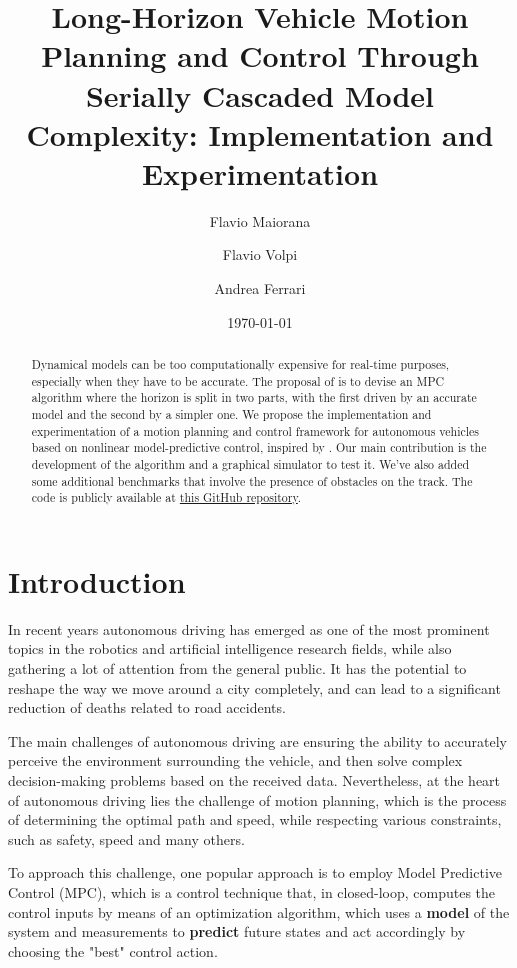 \documentclass[a4paper, onecolumn, 12pt]{article}
\title{Long-Horizon Vehicle Motion Planning and Control Through Serially Cascaded Model Complexity: Implementation and Experimentation}
\author{Flavio Maiorana \and Flavio Volpi \and Andrea Ferrari}
\date{\today}
\begin{document}
\maketitle
\begin{abstract}
    Dynamical models can be too computationally expensive for real-time
    purposes, especially when they have to be accurate. The proposal of
    \cite{paper} is to devise an MPC algorithm where the horizon is split in two
    parts, with the first driven by an accurate model and the second by a
    simpler one. We propose the implementation and experimentation of a motion
    planning and control framework for autonomous vehicles based on nonlinear
    model-predictive control, inspired by \cite{paper}. Our main contribution is
    the development of the algorithm and a graphical simulator to test it. We've
    also added some additional benchmarks that involve the presence of obstacles
    on the track. The code is publicly available at
    \href{https://github.com/neverorfrog/vehicle-control}{this GitHub
    repository}.
\end{abstract}

\newpage
\tableofcontents

\newpage
\section{Introduction}

In recent years autonomous driving has emerged as one of the most prominent
topics in the robotics and artificial intelligence research fields, while also
gathering a lot of attention from the general public. It has the potential to
reshape the way we move around a city completely, and can lead to a significant
reduction of deaths related to road accidents.

The main challenges of autonomous driving are ensuring the ability to accurately
perceive the environment surrounding the vehicle, and then solve complex
decision-making problems based on the received data. Nevertheless,  at the heart
of autonomous driving lies the challenge of motion planning, which is the
process of determining the optimal path and speed, while respecting various
constraints, such as safety, speed and many others.

To approach this challenge, one popular approach is to employ Model Predictive
Control (MPC), which is a control technique that, in closed-loop, computes the
control inputs by means of an optimization algorithm, which uses a
\textbf{model} of the system and measurements to \textbf{predict} future states
and act accordingly by choosing the "best" control action. 
\end{document}
